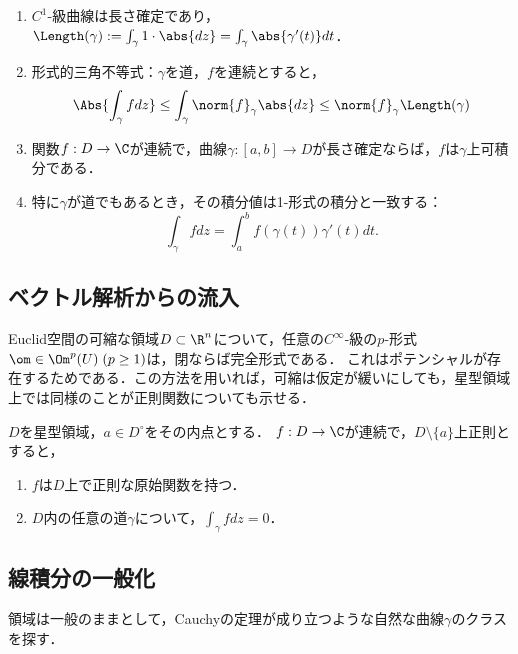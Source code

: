 \documentclass[uplatex, dvipdfmx]{jsreport}
\begin{document}
\begin{proposition}\mbox{}
    \begin{enumerate}
        \item $C^1$-級曲線は長さ確定であり，$\Length(\gamma):=\int_\gamma 1\cdot\abs{dz}=\int_\gamma\abs{\gamma'(t)}dt$．
        \item 形式的三角不等式：$\gamma$を道，$f$を連続とすると，
        \[\Abs{\int_\gamma fdz}\le\int_\gamma\norm{f}_\gamma\abs{dz}\le\norm{f}_\gamma\Length(\gamma)\]
        \item 関数$f:D\to\C$が連続で，曲線$\gamma:[a,b]\to D$が長さ確定ならば，$f$は$\gamma$上可積分である．
        \item 特に$\gamma$が道でもあるとき，その積分値は1-形式の積分と一致する：
        \[\int_\gamma fdz=\int^b_af(\gamma(t))\gamma'(t)dt.\]
    \end{enumerate}
\end{proposition}

\subsection{ベクトル解析からの流入}

\begin{discussion}[ベクトル解析の結果の翻訳]
    Euclid空間の可縮な領域$D\subset\R^n$について，任意の$C^\infty$-級の$p$-形式$\om\in\Om^p(U)\;(p\ge 1)$は，閉ならば完全形式である．
    これはポテンシャルが存在するためである．この方法を用いれば，可縮は仮定が緩いにしても，星型領域上では同様のことが正則関数についても示せる．
\end{discussion}

\begin{theorem}
    $D$を星型領域，$a\in D^\circ$をその内点とする．
    $f:D\to\C$が連続で，$D\setminus\{a\}$上正則とすると，
    \begin{enumerate}
        \item $f$は$D$上で正則な原始関数を持つ．
        \item $D$内の任意の道$\gamma$について，$\int_\gamma fdz=0$．
    \end{enumerate}
\end{theorem}

\subsection{線積分の一般化}

\begin{tcolorbox}[colframe=ForestGreen, colback=ForestGreen!10!white,breakable,colbacktitle=ForestGreen!40!white,coltitle=black,fonttitle=\bfseries\sffamily,
title=]
    領域は一般のままとして，Cauchyの定理が成り立つような自然な曲線$\gamma$のクラスを探す．
\end{tcolorbox}
\end{document}
